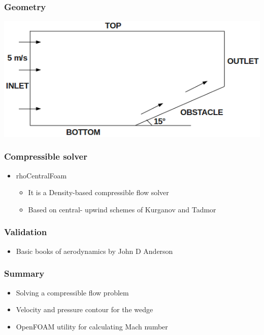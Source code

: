 \documentclass[17pt]{beamer}
\begin{document}
	\begin{frame}[<+-|alert@+>]
	\transdissolve \frametitle{Geometry}
	
	\includegraphics[height=3.8 cm]{slide1.pdf}
	
	\end{frame}
	
	\begin{frame}[<+-|alert@+>]
	
		\transdissolve \frametitle{Compressible solver}
			
		\begin{itemize}
			\item {rhoCentralFoam} \pause
			\begin{itemize}
			\item{It is a Density-based compressible flow solver}\pause
			\item{Based on central- upwind schemes of Kurganov and Tadmor}
			\end{itemize}
			\end{itemize}
	\end{frame}
	
	\begin{frame}[<+-|alert@+>]
	\transdissolve \frametitle{Validation}
	\begin{itemize}
	\item{Basic books of aerodynamics by John D Anderson}
	\end{itemize}
	\end{frame}
	
		
\begin{frame}[<+-|alert@+>]
		\transdissolve \frametitle{Summary}

\begin{itemize}
				
				\item{Solving a compressible flow problem}\pause
				\item{Velocity and pressure contour for the wedge}\pause
				\item{OpenFOAM utility for calculating Mach number}
			\end{itemize}
	\end{frame}
\end{document}
